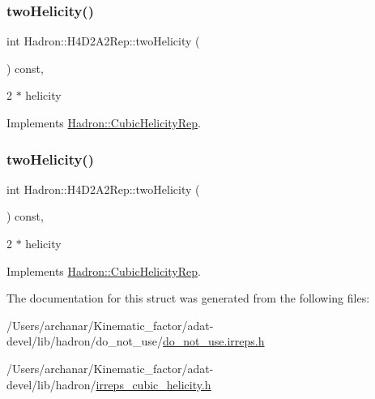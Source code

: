 \subsubsection{\texorpdfstring{twoHelicity()}{twoHelicity()}\hspace{0.1cm}{\footnotesize\ttfamily [2/3]}}
{\footnotesize\ttfamily int Hadron\+::\+H4\+D2\+A2\+Rep\+::two\+Helicity (\begin{DoxyParamCaption}{ }\end{DoxyParamCaption}) const\hspace{0.3cm}{\ttfamily [inline]}, {\ttfamily [virtual]}}

2 $\ast$ helicity 

Implements \mbox{\hyperlink{structHadron_1_1CubicHelicityRep_af507aa56fc2747eacc8cb6c96db31ecc}{Hadron\+::\+Cubic\+Helicity\+Rep}}.

\mbox{\label{structHadron_1_1H4D2A2Rep_a2d246b554a8500cb82a99cd8139bf313}} 
\subsubsection{\texorpdfstring{twoHelicity()}{twoHelicity()}\hspace{0.1cm}{\footnotesize\ttfamily [3/3]}}
{\footnotesize\ttfamily int Hadron\+::\+H4\+D2\+A2\+Rep\+::two\+Helicity (\begin{DoxyParamCaption}{ }\end{DoxyParamCaption}) const\hspace{0.3cm}{\ttfamily [inline]}, {\ttfamily [virtual]}}

2 $\ast$ helicity 

Implements \mbox{\hyperlink{structHadron_1_1CubicHelicityRep_af507aa56fc2747eacc8cb6c96db31ecc}{Hadron\+::\+Cubic\+Helicity\+Rep}}.



The documentation for this struct was generated from the following files\+:\begin{DoxyCompactItemize}
\item 
/\+Users/archanar/\+Kinematic\+\_\+factor/adat-\/devel/lib/hadron/do\+\_\+not\+\_\+use/\mbox{\hyperlink{adat-devel_2lib_2hadron_2do__not__use_2do__not__use_8irreps_8h}{do\+\_\+not\+\_\+use.\+irreps.\+h}}\item 
/\+Users/archanar/\+Kinematic\+\_\+factor/adat-\/devel/lib/hadron/\mbox{\hyperlink{adat-devel_2lib_2hadron_2irreps__cubic__helicity_8h}{irreps\+\_\+cubic\+\_\+helicity.\+h}}\end{DoxyCompactItemize}
